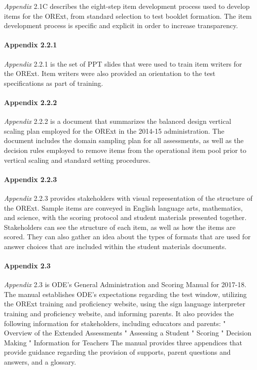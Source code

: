 \documentclass[]{article}
\let\oldparagraph\paragraph
\renewcommand{\paragraph}[1]{\oldparagraph{#1}\mbox{}}
\begin{document}
\emph{Appendix} 2.1C describes the eight-step item development process
used to develop items for the ORExt, from standard selection to test
booklet formation. The item development process is specific and explicit
in order to increase transparency.

\paragraph{Appendix 2.2.1}\label{appendix-2.2.1}

\emph{Appendix} 2.2.1 is the set of PPT slides that were used to train
item writers for the ORExt. Item writers were also provided an
orientation to the test specifications as part of training.

\paragraph{Appendix 2.2.2}\label{appendix-2.2.2}

\emph{Appendix} 2.2.2 is a document that summarizes the balanced design
vertical scaling plan employed for the ORExt in the 2014-15
administration. The document includes the domain sampling plan for all
assessments, as well as the decision rules employed to remove items from
the operational item pool prior to vertical scaling and standard setting
procedures.

\paragraph{Appendix 2.2.3}\label{appendix-2.2.3}

\emph{Appendix} 2.2.3 provides stakeholders with visual representation
of the structure of the ORExt. Sample items are conveyed in English
language arts, mathematics, and science, with the scoring protocol and
student materials presented together. Stakeholders can see the structure
of each item, as well as how the items are scored. They can also gather
an idea about the types of formats that are used for answer choices that
are included within the student materials documents.

\paragraph{Appendix 2.3}\label{appendix-2.3}

\emph{Appendix} 2.3 is ODE's General Administration and Scoring Manual
for 2017-18. The manual establishes ODE's expectations regarding the
test window, utilizing the ORExt training and proficiency website, using
the sign language interpreter training and proficiency website, and
informing parents. It also provides the following information for
stakeholders, including educators and parents: " Overview of the
Extended Assessments " Assessing a Student " Scoring " Decision Making "
Information for Teachers The manual provides three appendices that
provide guidance regarding the provision of supports, parent questions
and answers, and a glossary.
\end{document}
